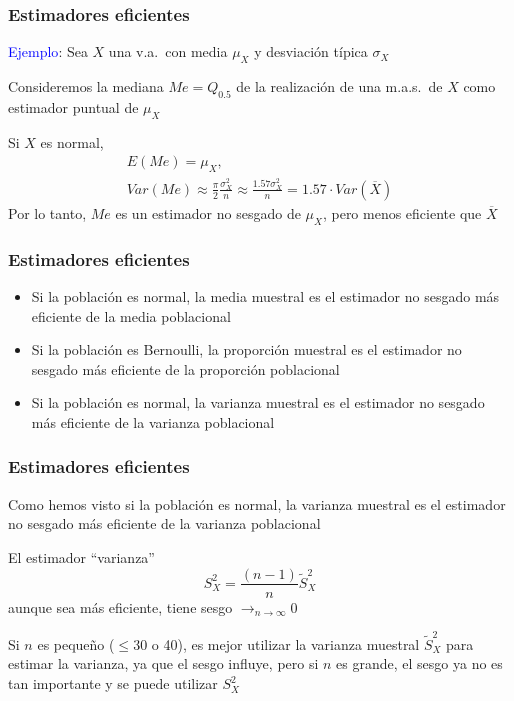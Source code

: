 \documentclass[12pt,t]{beamer}
\newcommand{\blue}[1]{\textcolor{blue}{#1}}
\renewcommand{\leq}{\leqslant}
\def\tendeix{{\displaystyle\mathop{\longrightarrow}_{\scriptscriptstyle
n\to\infty}}}
\theoremstyle{plain}
\theoremstyle{definition}
\begin{document}
\begin{frame}
\frametitle{Estimadores eficientes}

\blue{Ejemplo}: Sea $X$ una v.a.\ con media $\mu_X$ y desviación típica $\sigma_X$
\medskip

Consideremos la mediana $Me=Q_{0.5}$ de la realización de una m.a.s.\ de $X$ como estimador puntual de $\mu_X$
\medskip

Si $X$ es normal, 
$$
\begin{array}{l}
E(Me)=\mu_X,\\
\displaystyle  Var(Me)\approx \frac{\pi}{2}
     \frac{\sigma_{X}^2}{n}\approx \frac{1.57 \sigma_{X}^2}{n}=1.57\cdot Var(\overline{X})
\end{array}
$$
Por  lo tanto, $Me$ es un estimador no sesgado de   $\mu_X$, pero menos eficiente que $\overline{X}$



\end{frame}


\begin{frame}
\frametitle{Estimadores  eficientes}

\begin{itemize}
\item Si la población es normal, la media muestral es el estimador
no sesgado más eficiente de la media poblacional
\medskip

\item Si la población es Bernoulli, la proporción muestral es el estimador
no sesgado más eficiente de la proporción poblacional
\medskip

\item Si la población es normal, la varianza muestral es el estimador
no sesgado  más eficiente de la varianza poblacional
 \end{itemize}




\end{frame}


\begin{frame}
\frametitle{Estimadores  eficientes}

Como hemos visto  si la población es normal, la varianza muestral es el estimador
no sesgado  más eficiente de la varianza poblacional
\medskip

El estimador ``varianza''
$$
S_X^2=\frac{(n-1)}{n} \widetilde{S}_X^2
$$   
aunque sea   más eficiente, tiene sesgo $\tendeix 0$
\medskip

Si $n$ es pequeño ($\leq 30$ o 40), es mejor utilizar  la varianza muestral $\widetilde{S}_X^2$ para estimar la varianza, ya que el sesgo influye, pero si $n$ es grande, el sesgo ya no es tan importante y se puede utilizar $S_X^2$


\end{frame}
\end{document}
